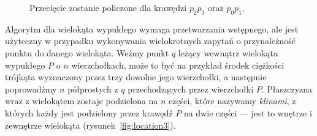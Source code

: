 \begin{figure}[htp]
  \centering
  \caption{Przecięcie zostanie policzone dla krawędzi $p_{2}p_{3}$
    oraz $p_{0}p_{1}$.}
\end{figure}

Algorytm dla wielokąta wypukłego wymaga przetwarzania wstępnego, ale
jest użyteczny w przypadku wykonywania wielokrotnych zapytań o
przynależność punktu do danego wielokąta. Weźmy punkt $q$ leżący
wewnątrz wielokąta wypukłego $P$ o $n$ wierzchołkach, może to być na
przykład środek ciężkości trójkąta wyznaczony przez trzy dowolne jego
wierzchołki, a następnie poprowadźmy $n$ półprostych z $q$
przechodzących przez wierzchołki $P$. Płaszczyzna wraz z wielokątem
zostaje podzielona na $n$ części, które nazywamy \emph{klinami}, z
których każdy jest podzielony przez krawędź $P$ na dwie części ---
jest to wnętrze i zewnętrze wielokąta (rysunek~\ref{fig:location3}).

